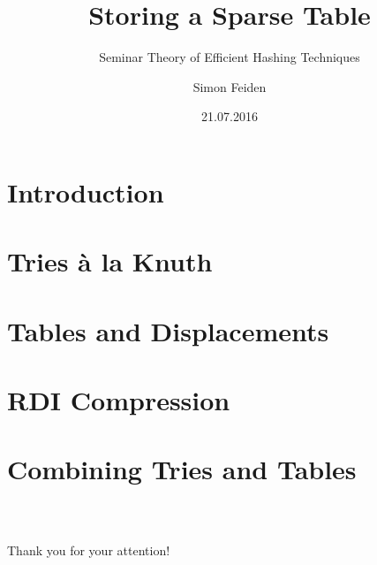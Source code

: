 \documentclass{beamer}
\title{Storing a Sparse Table}
\subtitle{Seminar Theory of Efficient Hashing Techniques}
\date{21.07.2016}
\author{Simon Feiden}
\begin{document}
	
	
\maketitle

\begin{frame}
	\tableofcontents
\end{frame}


\section{Introduction}



\section{Tries à la Knuth}



\section{Tables and Displacements}




\section{RDI Compression}



\section{Combining Tries and Tables}



\begin{frame}
	\frametitle{\ }
	\begin{center}
		\LARGE Thank you for your attention!
	\end{center}
\end{frame}


\begin{frame}
\end{frame}







\end{document}
